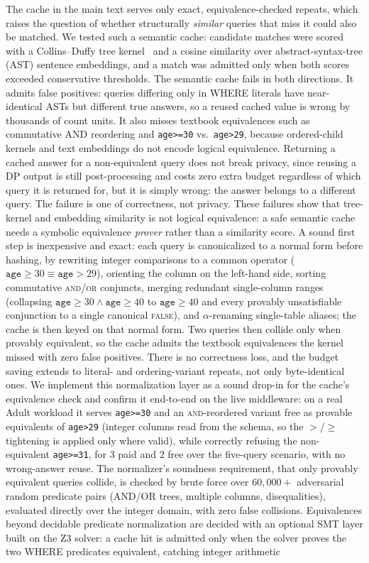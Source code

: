 \documentclass[sigconf,nonacm]{acmart}
\begin{document}
The cache in the main text serves only exact, equivalence-checked repeats, which raises the question of whether structurally \emph{similar} queries that miss it could also be matched. We tested such a semantic cache: candidate matches were scored with a Collins--Duffy tree kernel~\cite{collins2001convolution} and a cosine similarity over abstract-syntax-tree (AST) sentence embeddings, and a match was admitted only when both scores exceeded conservative thresholds. The semantic cache fails in both directions. It admits false positives: queries differing only in WHERE literals have near-identical ASTs but different true answers, so a reused cached value is wrong by thousands of count units. It also misses textbook equivalences such as commutative AND reordering and \texttt{age>=30} vs.\ \texttt{age>29}, because ordered-child kernels and text embeddings do not encode logical equivalence. Returning a cached answer for a non-equivalent query does not break privacy, since reusing a DP output is still post-processing and costs zero extra budget regardless of which query it is returned for, but it is simply wrong: the answer belongs to a different query. The failure is one of correctness, not privacy. These failures show that tree-kernel and embedding similarity is not logical equivalence: a safe semantic cache needs a symbolic equivalence \emph{prover} rather than a similarity score. A sound first step is inexpensive and exact: each query is canonicalized to a normal form before hashing, by rewriting integer comparisons to a common operator ($\texttt{age}\ge30\equiv\texttt{age}>29$), orienting the column on the left-hand side, sorting commutative \textsc{and}/\textsc{or} conjuncts, merging redundant single-column ranges (collapsing $\texttt{age}\ge30\wedge\texttt{age}\ge40$ to $\texttt{age}\ge40$ and every provably unsatisfiable conjunction to a single canonical \textsc{false}), and $\alpha$-renaming single-table aliases; the cache is then keyed on that normal form. Two queries then collide only when provably equivalent, so the cache admits the textbook equivalences the kernel missed with zero false positives. There is no correctness loss, and the budget saving extends to literal- and ordering-variant repeats, not only byte-identical ones. We implement this normalization layer as a sound drop-in for the cache's equivalence check and confirm it end-to-end on the live middleware: on a real Adult workload it serves \texttt{age>=30} and an \textsc{and}-reordered variant free as provable equivalents of \texttt{age>29} (integer columns read from the schema, so the $>\!/\!\ge$ tightening is applied only where valid), while correctly refusing the non-equivalent \texttt{age>=31}, for $3$ paid and $2$ free over the five-query scenario, with no wrong-answer reuse. The normalizer's soundness requirement, that only provably equivalent queries collide, is checked by brute force over $60{,}000{+}$ adversarial random predicate pairs (AND/OR trees, multiple columns, disequalities), evaluated directly over the integer domain, with zero false collisions. Equivalences beyond decidable predicate normalization are decided with an optional SMT layer built on the Z3 solver: a cache hit is admitted only when the solver proves the two WHERE predicates equivalent, catching integer arithmetic 
\end{document}
